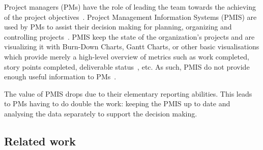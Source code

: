 \documentclass[a4paper, 12pt]{article}
\begin{document}

Project managers (PMs) have the role of leading the team towards the achieving of the project objectives~\cite{institute2017guide}. Project Management Information Systems (PMIS) are used by PMs to assist their decision making for planning, organizing and controlling projects~\cite{CANIELS2012162}. PMIS keep the state of the organization's projects and are visualizing it with Burn-Down Charts, Gantt Charts, or other basic visualisations which provide merely a high-level overview of metrics such as work completed, story points completed, deliverable status~\cite{institute2017guide}, etc. As such, PMIS do not provide enough useful information to PMs~\cite{CANIELS2012162}. 

The value of PMIS drops due to their elementary reporting abilities. This leads to PMs having to do double the work: keeping the PMIS up to date and analysing the data separately to support the decision making.




\subsection{Related work}
\end{document}
